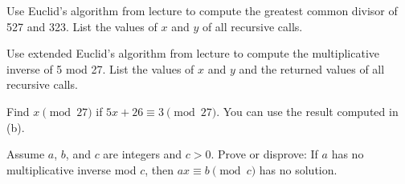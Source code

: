 
\begin{Parts}
    \Part Use Euclid's algorithm from lecture to compute the greatest common divisor of 527 and 323. List the values of $x$ and $y$ of all recursive calls.

    \Part Use extended Euclid's algorithm from lecture to compute the multiplicative inverse of 5 mod 27. List the values of $x$ and $y$ and the returned values of all recursive calls.

    \Part Find $x \pmod{27}$ if $5x + 2 6 \equiv 3 \pmod{27}$. You can use the result computed in (b).

    \Part Assume $a$, $b$, and $c$ are integers and $c>0$. Prove or disprove: If $a$ has no multiplicative inverse mod $c$, then $ax \equiv b \pmod{c}$ has no solution.

\end{Parts}


